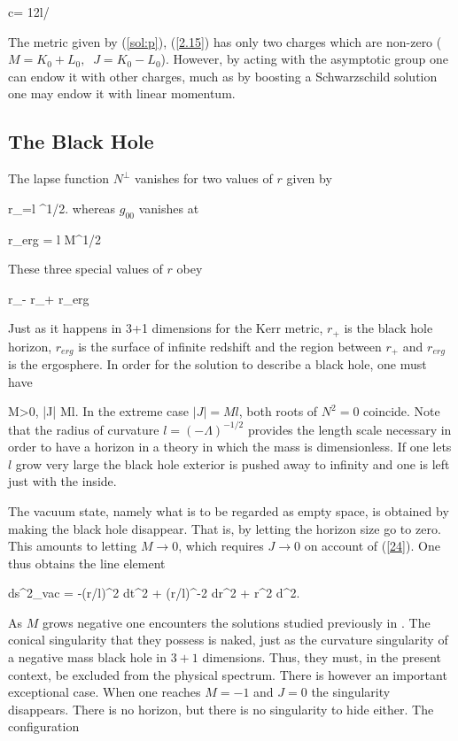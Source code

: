 \bb
c= 12l/\hbar
\label{2.20.2}
\ee

The metric given by (\ref{sol:p}), (\ref{2.15}) has only two
charges which are non-zero ($M =K_0 +L_0,\;\; J= K_0 -L_0$).
However, by acting with the asymptotic group one can endow it
with other charges, much as by boosting a Schwarzschild solution
one may endow it with linear momentum.


\subsection{The Black Hole}

The lapse function $N^{\perp}$ vanishes for two values of $r$
given by

\bb
r_{\pm}=l ^{1/2}.
\label{21}
\ee
%
whereas $g_{00}$ vanishes at

\bb
r_{erg} = l M^{1/2}
\label{22}
\ee

These three special values of $r$ obey

\bb
r_{-} \leq r_{+} \leq r_{erg}
\label{23}
\ee

Just as it happens in 3+1 dimensions for the Kerr metric, $r_{+}$
is the black hole horizon, $r_{erg}$ is the surface of infinite
redshift and the region between $r_{+}$ and $r_{erg}$ is the
ergosphere. In order for the solution to describe a black hole,
one must have

\bb
    M>0,  \;\;\;\;  |J| \leq Ml.
\label{24}
\ee
%
In the extreme case $|J|=Ml$, both roots of $N^2=0$ coincide.
Note that the radius of curvature $l=(-\Lambda)^{-1/2}$ provides the
length scale necessary in order to have a horizon in a theory in which the
mass is dimensionless. If one lets $l$ grow very large the black hole
exterior is pushed away to infinity and one is left just with the inside.

The vacuum state, namely what is to be regarded as empty space, is
obtained by making the black hole disappear. That is, by letting
the horizon size go to zero. This amounts to letting
$M\rightarrow 0$, which requires $J\rightarrow 0$ on account of
(\ref{24}). One thus obtains the line element

\bb
ds^2_{vac} = -(r/l)^2 dt^2 + (r/l)^{-2} dr^2 + r^2 d\phi^2.
\label{25}
\ee

As $M$ grows negative one encounters the solutions studied
previously in \cite{7}. The conical singularity that
they possess is naked, just as the curvature singularity of a
negative mass black hole in $3+1$ dimensions.  Thus, they must,
in the present context, be excluded from the physical spectrum.
There is however an important exceptional case. When one reaches
$M=-1$ and $J=0$ the singularity disappears.  There is no
horizon, but there is no singularity to hide either.  The
configuration

